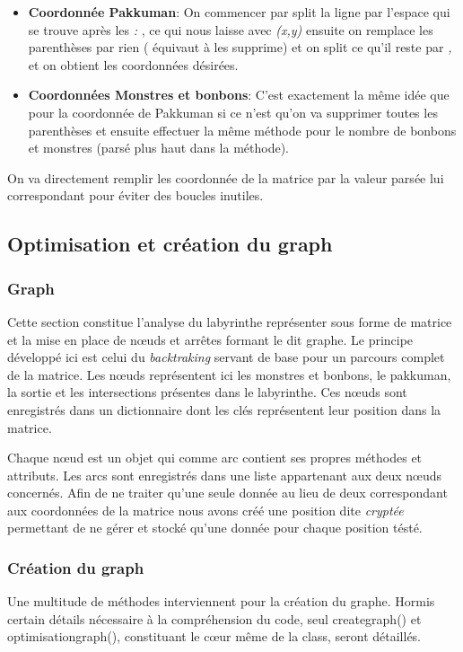 \documentclass[12pt, oneside]{article}
\begin{document}
\begin{itemize}
\item 
\textbf{Coordonnée Pakkuman}: On commencer par split la ligne par l'espace qui se trouve après les \emph{:} , ce qui nous laisse avec \emph{(x,y)} ensuite on remplace les parenthèses par rien ( équivaut à les supprime) et on split ce qu'il reste par \emph{,} et on obtient les coordonnées désirées.
\item
\textbf{Coordonnées Monstres et bonbons}: C'est exactement la même idée que pour la coordonnée de Pakkuman si ce n'est qu'on va supprimer toutes les parenthèses et ensuite effectuer la même méthode pour le nombre de bonbons et monstres (parsé plus haut dans la méthode).

\end{itemize}
On va directement remplir les coordonnée de la matrice par la valeur parsée lui correspondant pour éviter des boucles inutiles.

\subsection{Optimisation et création du graph}
\subsubsection{Graph}
Cette section constitue l’analyse du labyrinthe représenter sous forme de matrice et la mise en place de nœuds et arrêtes formant le dit graphe.
Le principe développé ici est celui du \emph{backtraking}  servant de base pour un parcours complet de la matrice. Les nœuds représentent ici les monstres et bonbons, le pakkuman, la sortie et les intersections présentes dans le labyrinthe. Ces nœuds sont enregistrés dans un dictionnaire dont les clés représentent leur position dans la matrice.

Chaque nœud est un objet qui comme arc contient ses propres méthodes et attributs. Les arcs sont enregistrés dans une liste appartenant aux deux nœuds concernés. 
Afin de ne traiter qu’une seule donnée au lieu de deux correspondant aux coordonnées de la matrice nous avons créé une position dite \emph{cryptée} permettant de ne gérer et stocké qu’une donnée pour chaque position tésté.
\subsubsection{Création du graph}
Une multitude de méthodes interviennent pour la création du graphe. Hormis certain détails nécessaire à la compréhension  du code, seul create\textunderscore graph() et optimisation\textunderscore graph(), constituant le cœur même de la class, seront détaillés.
\end{document}

